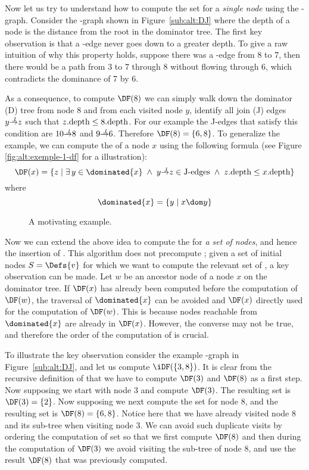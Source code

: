 {Now let us try to understand how to compute the \DF set for a \emph{single node} using the \DJ-graph. 
Consider the \DJ-graph shown in Figure~\ref{sub:alt:DJ} where the depth of a node is the distance from the root in the dominator tree. 
The first key observation is that a \DF-edge never goes down to a greater depth. 
To give a raw intuition of why this property holds, suppose there was a \DF-edge from 8 to 7, then there would be a path from 3 to 7 through 8 without flowing through 6, which contradicts the dominance of 7 by 6.


As a consequence, to compute $\DF(8)$ we can simply walk down the dominator (D) tree from node 8 and from each visited node $y$, identify all join (J) edges $y \st{J} z$ such that $z.\textrm{depth} \leq 8.\textrm{depth}$. 
For our example the J-edges that satisfy this condition are $10 \st{J} 8$ and $9 \st{J} 6$. 
Therefore $\DF(8) = \{6, 8\}$. 
To generalize the example, we can compute the \DF of a node $x$ using the following formula (see Figure \ref{fig:alt:exemple-1-df} for a illustration):
$$\DF(x) = \{z\mid\exists\, y\in\dominated{x} \; \wedge \; y \st{J} z \in \textrm{J-edges} \; \wedge \; z.\depth \leq x.\depth \}$$
where 
$$\dominated{x} = \{ y\mid x\dom y \}$$


\begin{figure}[htb]
  \caption{A motivating example.}
  \label{fig:cfg}
\end{figure} 

Now we can extend the above idea to compute the \iDF for \emph{a set of nodes}, and hence the insertion of \phifuns. 
This algorithm does not precompute \DF; 
given a set of initial nodes $S=\Defs{v}$ for which we want to compute the relevant set of \phifuns, a key observation can be made. 
Let $w$ be an ancestor node of a node $x$ on the dominator tree. 
If $\DF(x)$ has already been computed before the computation of $\DF(w)$, the traversal of $\dominated{x}$ can be avoided and $\DF(x)$ directly used for the computation of $\DF(w)$. 
This is because nodes reachable from $\dominated{x}$ are already in $\DF(x)$. 
However, the converse may not be true, and therefore the order of the computation of \DF is crucial.

To illustrate the key observation consider the example \DJ-graph in Figure~\ref{sub:alt:DJ}, and let us compute $\iDF(\{3,8\})$. 
It is clear from the recursive definition of \iDF that we have to compute $\DF(3)$ and $\DF(8)$ as a first step. 
Now supposing we start with node $3$ and compute $\DF(3)$. 
The resulting \DF set is $\DF(3) = \{2\}$. 
Now supposing we next compute the \DF set for node $8$, and the resulting set is $\DF(8) = \{6,8\}$. 
Notice here that we have already visited node $8$ and its sub-tree when visiting node $3$. 
We can avoid such duplicate visits by ordering the computation of \DF set so that we first compute $\DF(8)$ and then during the computation of $\DF(3)$ we avoid visiting the sub-tree of node $8$, and use the result $\DF(8)$ that was previously computed.

}
